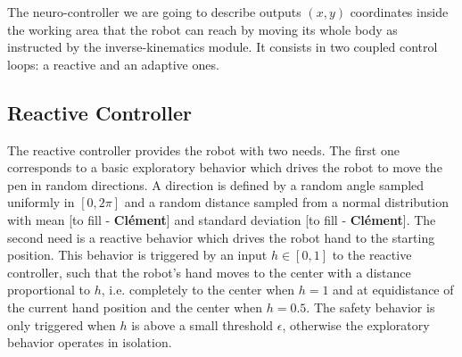 \documentclass[letterpaper, 10 pt, conference]{ieeeconf}  %
\newcommand\cmf[1]{{\footnotesize \color{red}[#1 - \textbf{Cl\'ement}]}} %
\begin{document}
The neuro-controller we are going to describe outputs $(x, y)$ coordinates inside the working area that the robot can reach by moving its whole body as instructed by the inverse-kinematics module. It consists in two coupled control loops: a reactive and an adaptive ones.

\subsection{Reactive Controller}

The reactive controller provides the robot with two needs. The first one corresponds to a basic exploratory behavior which drives the robot to move the pen in random directions. A direction is defined by a random angle sampled uniformly in $[0, 2\pi]$ and a random distance  sampled from a normal distribution with mean \cmf{to fill} and standard deviation \cmf{to fill}. The second need is a reactive behavior which drives the robot hand to the starting position. This behavior is triggered by an input $h \in [0,1]$ to the reactive controller, such that the robot's hand moves to the center with a distance proportional to $h$, i.e. completely to the center when $h=1$ and at equidistance of the current hand position and the center when $h=0.5$. The safety behavior is only triggered when $h$ is above a small threshold $\epsilon$, otherwise the exploratory behavior operates in isolation. 
\end{document}
